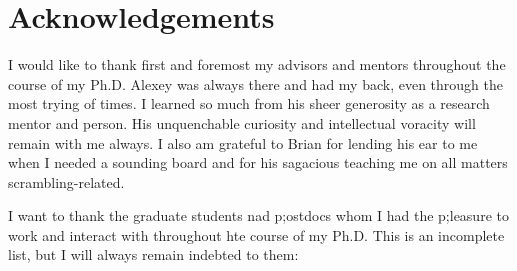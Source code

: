 \chapter{Acknowledgements}
I would like to thank first and foremost my advisors and mentors throughout the course of my Ph.D. Alexey was always there and had my back, even through the most trying of times. I learned so much from his sheer generosity as a research mentor and person. His unquenchable curiosity and intellectual voracity will remain with me always. I also am grateful to Brian for lending his ear to me when I needed a sounding board and for his sagacious teaching me on all matters scrambling-related.

I want to thank the graduate students nad p;ostdocs whom I had the p;leasure to work and interact with throughout hte course of my Ph.D. This is an incomplete list, but I will always remain indebted to them: 
